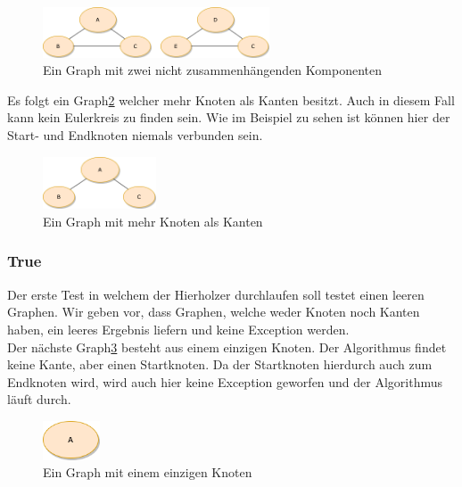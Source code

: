\begin{figure}[htbp]
	\centering
		\includegraphics[width=0.60\textwidth]{Latex/Figs/notCoherent.png}		
	\caption{Ein Graph mit zwei nicht zusammenhängenden Komponenten}
	\label{fig:notCoherent}
\end{figure}

Es folgt ein Graph\ref{fig:moreNodesThanEdges} welcher mehr Knoten als Kanten besitzt. Auch in diesem Fall kann kein Eulerkreis zu finden sein. Wie im Beispiel zu sehen ist können hier der Start- und Endknoten niemals verbunden sein.

\begin{figure}[htbp]
	\centering
		\includegraphics[width=0.30\textwidth]{Latex/Figs/moreNodesThanEdges.png}		
	\caption{Ein Graph mit mehr Knoten als Kanten}
	\label{fig:moreNodesThanEdges}
\end{figure}

\newpage

\subsubsection{True}

Der erste Test in welchem der Hierholzer durchlaufen soll testet einen leeren Graphen. Wir geben vor, dass Graphen, welche weder Knoten noch Kanten haben, ein leeres Ergebnis liefern und keine Exception werden.\\

Der nächste Graph\ref{fig:singleNode} besteht aus einem einzigen Knoten. Der Algorithmus findet keine Kante, aber einen Startknoten. Da der Startknoten hierdurch auch zum Endknoten wird, wird auch hier keine Exception geworfen und der Algorithmus läuft durch.

\begin{figure}[htbp]
	\centering
		\includegraphics[width=0.15\textwidth]{Latex/Figs/singleNode.png}		
	\caption{Ein Graph mit einem einzigen Knoten}
	\label{fig:singleNode}
\end{figure}

